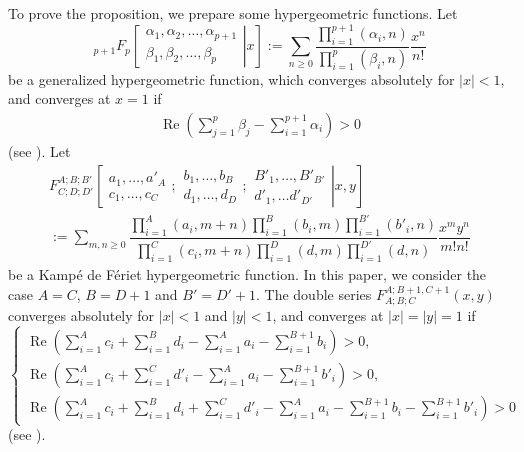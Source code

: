 \documentclass[11pt,a4,leqno]{amsart}
\theoremstyle{my theoremstyle}
\theoremstyle{dfn}
\theoremstyle{remark}
\renewcommand{\1}{\mathbbm{1}}
\numberwithin{equation}{section}
\begin{document}
To prove the proposition, we prepare some hypergeometric functions. 
Let $${_{p+1}F_{p}}\left[ \left. 
\begin{matrix}
\alpha_1, \alpha_2, \ldots, \alpha_{p+1} \\
\beta_1, \beta_2, \ldots, \beta_p
\end{matrix}
\right| x
\right]
:=
\sum_{n \ge 0} \dfrac{\prod_{i=1}^{p+1}(\alpha_i, n)}{\prod_{i=1}^p(\beta_i, n)} \dfrac{x^n}{n!}$$
be a generalized hypergeometric function, which converges absolutely for $|x|<1$, and converges at $x=1$ if 
\begin{align} \label{convergence_condition1}
\operatorname{Re} \left(\sum_{j=1}^{p} \beta_j -\sum_{i=1}^{p+1} \alpha_i\right) > 0
\end{align}
(see \cite{Slater66}). 
Let 
\begin{multline*}
F^{A;B;B'}_{C;D;D'}\left[\left.
\begin{matrix}
a_1, \ldots, a'_A \\
c_1, \ldots, c_C 
\end{matrix}
; 
\begin{matrix}
b_1, \ldots, b_B \\
d_1, \ldots, d_D
\end{matrix}
;
\begin{matrix}
B'_1, \ldots, B'_{B'} \\
d'_1, \ldots d'_{D'}
\end{matrix}
\right| x, y
\right] \\
:=
\sum_{m, n \ge 0}\dfrac{\prod_{i=1}^A(a_i, m+n) \prod_{i=1}^B(b_i, m) \prod_{i=1}^{B'}(b'_i, n)}{\prod_{i=1}^C(c_i, m+n) \prod_{i=1}^{D} (d, m)\prod_{i=1}^{D'}(d, n)} \dfrac{x^my^n}{m!n!}  
\end{multline*}
be a Kamp\'e de F\'eriet hypergeometric function. 
In this paper, we consider the case $A=C$, $B=D+1$ and $B'=D'+1$. 
The double series $F^{A;B+1, C+1}_{A; B; C}(x, y)$ converges absolutely for $|x|<1$ and $|y|<1$, and 
converges at $|x| = |y|=1$ if 
\begin{equation}\label{convergence_condition2}
    \begin{cases}
        \operatorname{Re} \left(\sum_{i=1}^A c_i + \sum_{i=1}^B d_i - \sum_{i=1}^A a_i -\sum_{i=1}^{B+1} b_i \right) >0, & \\
\operatorname{Re} \left(\sum_{i=1}^A c_i + \sum_{i=1}^C d'_i - \sum_{i=1}^A a_i -\sum_{i=1}^{B+1} b'_i \right) >0, & \\
\operatorname{Re} \left(\sum_{i=1}^A c_i +\sum_{i=1}^B d_i + \sum_{i=1}^C d'_i - \sum_{i=1}^A a_i -\sum_{i=1}^{B+1} b_i  -\sum_{i=1}^{B+1} b'_i \right)>0 &
    \end{cases}
\end{equation} 
(see \cite[Theorem 1]{HMS92}). 
\end{document}
